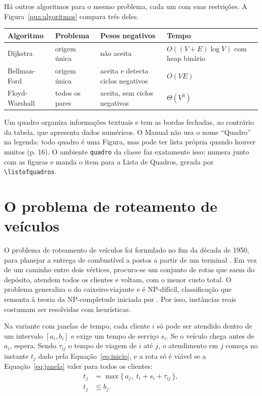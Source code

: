\documentclass[tese,capa]{texufpel}
\begin{document}
Há outros algoritmos para o mesmo problema, cada um com suas restrições. A
Figura~\ref{qua:algoritmos} compara três deles.

\begin{quadro}[htbp]
  \caption{Comparação entre algoritmos de caminho mínimo}
  \label{qua:algoritmos}
  \centering
  \begin{tabular}{|p{2.8cm}|p{2.6cm}|p{4.4cm}|p{4.2cm}|}
    \hline
    \textbf{Algoritmo} & \textbf{Problema} & \textbf{Pesos negativos} & \textbf{Tempo} \\ \hline
    Dijkstra       & origem única       & não aceita & $O((V + E) \log V)$ com heap binário \\ \hline
    Bellman-Ford   & origem única       & aceita e detecta ciclos negativos & $O(VE)$ \\ \hline
    Floyd-Warshall & todos os pares     & aceita, sem ciclos negativos & $\Theta(V^3)$ \\ \hline
  \end{tabular}
  \caption*{Fonte: Elaborado pela autora (2030), com base em \citet{Cormen:2022:IA}.}
\end{quadro}

Um quadro organiza informações textuais e tem as bordas fechadas, ao
contrário da tabela, que apresenta dados numéricos. O Manual não usa o nome
``Quadro'' na legenda: todo quadro é uma Figura, mas pode ter lista própria
quando houver muitos (p. 16). O ambiente \texttt{quadro} da classe faz
exatamente isso: numera junto com as figuras e manda o item para a Lista de
Quadros, gerada por \verb|\listofquadros|.

\section{O problema de roteamento de veículos}
\label{sec:vrp}

O problema de roteamento de veículos foi formulado no fim da década de
1950, para planejar a entrega de combustível a postos a partir de um terminal
\citep{Dantzig:1959:TDP}. Em vez de um caminho entre dois vértices,
procura-se um conjunto de rotas que saem do depósito, atendem todos os
clientes e voltam, com o menor custo total. O problema generaliza o do
caixeiro-viajante e é NP-difícil, classificação que remonta à teoria da
NP-completude iniciada por \citet{Cook:1971:CTP}. Por isso, instâncias reais
costumam ser resolvidas com heurísticas.

Na variante com janelas de tempo, cada cliente $i$ só pode ser atendido
dentro de um intervalo $[a_i, b_i]$ e exige um tempo de serviço $s_i$. Se o
veículo chega antes de $a_i$, espera. Sendo $\tau_{ij}$ o tempo de viagem de
$i$ até $j$, o atendimento em $j$ começa no instante $t_j$ dado pela
Equação~\eqref{eq:inicio}, e a rota só é viável se a
Equação~\eqref{eq:janela} valer para todos os clientes:
\begin{align}
  t_j &= \max \{\, a_j,\; t_i + s_i + \tau_{ij} \,\},
  \label{eq:inicio}\\
  t_j &\le b_j.
  \label{eq:janela}
\end{align}
\end{document}

